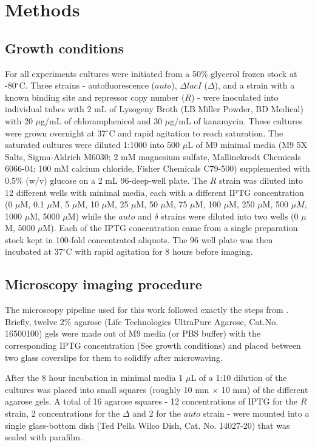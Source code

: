 \section{Methods}

\subsection{Growth conditions}

For all experiments cultures were initiated from a 50\% glycerol frozen stock at
-80$^\circ$C. Three strains - autofluorescence ($auto$), $\Delta lacI$
($\Delta$), and a strain with a known binding site and repressor copy number
($R$) - were inoculated into individual tubes with 2 mL of Lysogeny Broth (LB
Miller Powder, BD Medical) with 20 $\mu$g/mL of chloramphenicol and 30 $\mu$g/mL
of kanamycin. These cultures were grown overnight at 37$^\circ$C and rapid
agitation to reach saturation. The saturated cultures were diluted 1:1000 into
500 $\mu$L of M9 minimal media (M9 5X Salts, Sigma-Aldrich M6030; 2 mM magnesium
sulfate, Mallinckrodt Chemicals 6066-04; 100 mM calcium chloride, Fisher
Chemicals C79-500) supplemented with 0.5\% (w/v) glucose on a 2 mL 96-deep-well
plate. The $R$ strain was diluted into 12 different wells with minimal media,
each with a different IPTG  concentration (0 $\mu$M, 0.1 $\mu$M, 5 $\mu$M, 10
$\mu$M, 25 $\mu$M, 50 $\mu$M, 75 $\mu$M, 100 $\mu$M, 250 $\mu$M, 500 $\mu M$,
1000 $\mu$M, 5000 $\mu$M) while  the $auto$ and $\delta$ strains were diluted
into two wells (0 $\mu$M, 5000 $\mu$M). Each of the IPTG concentration came from
a single preparation stock kept in 100-fold concentrated aliquots. The 96 well
plate was then incubated at 37$^\circ$C with rapid agitation for 8 hours before
imaging.

\subsection{Microscopy imaging procedure}

The microscopy pipeline used for this work followed exactly the steps from
\cite{Razo-Mejia2018}. Briefly, twelve 2\% agarose (Life Technologies UltraPure
Agarose, Cat.No. 16500100) gels were made out of M9 media (or PBS buffer) with
the corresponding IPTG concentration (See growth conditions) and placed between
two glass coverslips for them to solidify after microwaving.

After the 8 hour incubation in minimal media 1 $\mu$L of a 1:10 dilution of the
cultures was placed into small squares (roughly 10 mm $\times$ 10 mm) of the
different agarose gels. A total of 16 agarose squares - 12 concentrations of
IPTG for the $R$ strain, 2 concentrations for the $\Delta$ and 2 for the $auto$
strain - were mounted into a single glass-bottom dish (Ted Pella Wilco Dish,
Cat. No. 14027-20) that was sealed with parafilm.

